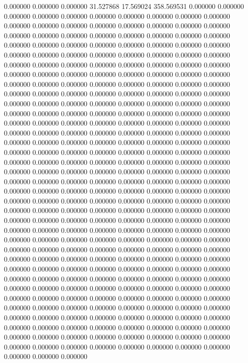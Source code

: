 0.000000 0.000000 0.000000
31.527868 17.569024 358.569531
0.000000 0.000000 0.000000
0.000000 0.000000 0.000000
0.000000 0.000000 0.000000
0.000000 0.000000 0.000000
0.000000 0.000000 0.000000
0.000000 0.000000 0.000000
0.000000 0.000000 0.000000
0.000000 0.000000 0.000000
0.000000 0.000000 0.000000
0.000000 0.000000 0.000000
0.000000 0.000000 0.000000
0.000000 0.000000 0.000000
0.000000 0.000000 0.000000
0.000000 0.000000 0.000000
0.000000 0.000000 0.000000
0.000000 0.000000 0.000000
0.000000 0.000000 0.000000
0.000000 0.000000 0.000000
0.000000 0.000000 0.000000
0.000000 0.000000 0.000000
0.000000 0.000000 0.000000
0.000000 0.000000 0.000000
0.000000 0.000000 0.000000
0.000000 0.000000 0.000000
0.000000 0.000000 0.000000
0.000000 0.000000 0.000000
0.000000 0.000000 0.000000
0.000000 0.000000 0.000000
0.000000 0.000000 0.000000
0.000000 0.000000 0.000000
0.000000 0.000000 0.000000
0.000000 0.000000 0.000000
0.000000 0.000000 0.000000
0.000000 0.000000 0.000000
0.000000 0.000000 0.000000
0.000000 0.000000 0.000000
0.000000 0.000000 0.000000
0.000000 0.000000 0.000000
0.000000 0.000000 0.000000
0.000000 0.000000 0.000000
0.000000 0.000000 0.000000
0.000000 0.000000 0.000000
0.000000 0.000000 0.000000
0.000000 0.000000 0.000000
0.000000 0.000000 0.000000
0.000000 0.000000 0.000000
0.000000 0.000000 0.000000
0.000000 0.000000 0.000000
0.000000 0.000000 0.000000
0.000000 0.000000 0.000000
0.000000 0.000000 0.000000
0.000000 0.000000 0.000000
0.000000 0.000000 0.000000
0.000000 0.000000 0.000000
0.000000 0.000000 0.000000
0.000000 0.000000 0.000000
0.000000 0.000000 0.000000
0.000000 0.000000 0.000000
0.000000 0.000000 0.000000
0.000000 0.000000 0.000000
0.000000 0.000000 0.000000
0.000000 0.000000 0.000000
0.000000 0.000000 0.000000
0.000000 0.000000 0.000000
0.000000 0.000000 0.000000
0.000000 0.000000 0.000000
0.000000 0.000000 0.000000
0.000000 0.000000 0.000000
0.000000 0.000000 0.000000
0.000000 0.000000 0.000000
0.000000 0.000000 0.000000
0.000000 0.000000 0.000000
0.000000 0.000000 0.000000
0.000000 0.000000 0.000000
0.000000 0.000000 0.000000
0.000000 0.000000 0.000000
0.000000 0.000000 0.000000
0.000000 0.000000 0.000000
0.000000 0.000000 0.000000
0.000000 0.000000 0.000000
0.000000 0.000000 0.000000
0.000000 0.000000 0.000000
0.000000 0.000000 0.000000
0.000000 0.000000 0.000000
0.000000 0.000000 0.000000
0.000000 0.000000 0.000000
0.000000 0.000000 0.000000
0.000000 0.000000 0.000000
0.000000 0.000000 0.000000
0.000000 0.000000 0.000000
0.000000 0.000000 0.000000
0.000000 0.000000 0.000000
0.000000 0.000000 0.000000
0.000000 0.000000 0.000000
0.000000 0.000000 0.000000
